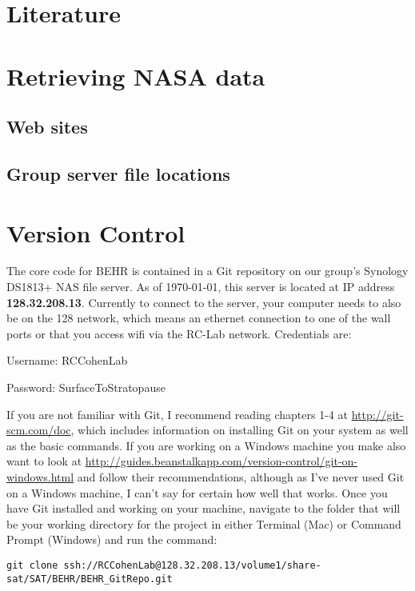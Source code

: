 \documentclass[12pt]{article}
\begin{document}
\section{Literature}

\section{Retrieving NASA data}
	\subsection{Web sites}
	\subsection{Group server file locations}

\section{Version Control}
	
	The core code for BEHR is contained in a Git repository on our group's Synology DS1813+ NAS file server.  As of \today, this server is located at IP address \textbf{128.32.208.13}.  Currently to connect to the server, your computer needs to also be on the 128 network, which means an ethernet connection to one of the wall ports or that you access wifi via the RC-Lab network.  Credentials are:
	
	\vspace{12pt}
	Username: RCCohenLab
	
	Password: SurfaceToStratopause
	
	\vspace{12pt}
	If you are not familiar with Git, I recommend reading chapters 1-4 at \url{http://git-scm.com/doc}, which includes information on installing Git on your system as well as the basic commands.  If you are working on a Windows machine you make also want to look at \url{http://guides.beanstalkapp.com/version-control/git-on-windows.html} and follow their recommendations, although as I've never used Git on a Windows machine, I can't say for certain how well that works.  
	Once you have Git installed and working on your machine, navigate to the folder that will be your working directory for the project in either Terminal (Mac) or Command Prompt (Windows) and run the command:

\vspace{12pt}
	\begin{sloppypar}
\noindent\lstinline[breaklines=true]|git clone ssh://RCCohenLab@128.32.208.13/volume1/share-sat/SAT/BEHR/BEHR_GitRepo.git|
	\end{sloppypar}
	
\end{document}
